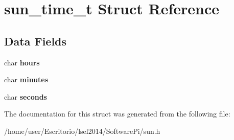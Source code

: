 \hypertarget{structsun__time__t}{\section{sun\-\_\-time\-\_\-t \-Struct \-Reference}
\label{structsun__time__t}
}
\subsection*{\-Data \-Fields}
\begin{DoxyCompactItemize}
\item 
\hypertarget{structsun__time__t_a4808e755b307f73adaf60447b23bcd52}{char {\bfseries hours}}\label{structsun__time__t_a4808e755b307f73adaf60447b23bcd52}

\item 
\hypertarget{structsun__time__t_a3e1f7cc25686f64a1f0a2a69a213103a}{char {\bfseries minutes}}\label{structsun__time__t_a3e1f7cc25686f64a1f0a2a69a213103a}

\item 
\hypertarget{structsun__time__t_a4b049a3caf70550985bc26ff04efa078}{char {\bfseries seconds}}\label{structsun__time__t_a4b049a3caf70550985bc26ff04efa078}

\end{DoxyCompactItemize}


\-The documentation for this struct was generated from the following file\-:\begin{DoxyCompactItemize}
\item 
/home/user/\-Escritorio/lsel2014/\-Software\-Pi/sun.\-h\end{DoxyCompactItemize}
